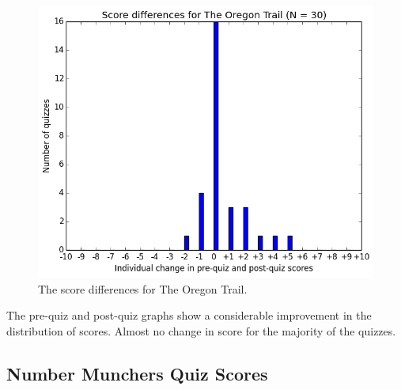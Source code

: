 			\begin{figure}[] 
			\centering 
			\includegraphics[width=\textwidth]{oregon_results.png} 
			\caption{The score differences for The Oregon Trail.}
			\end{figure}

			The pre-quiz and post-quiz graphs show a considerable improvement in the distribution of scores. Almost no change in score for the majority of the quizzes.

			\clearpage

		\subsection{Number Munchers Quiz Scores}

